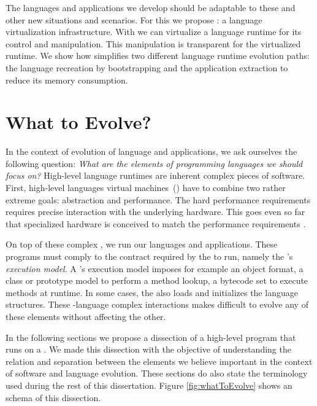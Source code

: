 The languages and applications we develop should be adaptable to these and other new situations and scenarios. For this we propose \emph{\Vtt}: a language virtualization infrastructure. With \Vtt we can virtualize a language runtime for its control and manipulation. This manipulation is transparent for the virtualized runtime. We show how \Vtt simplifies two different language runtime evolution paths: the language recreation by bootstrapping and the application extraction to reduce its memory consumption.

\section{What to Evolve?}

In the context of evolution of language and applications, we ask ourselves the following question: \emph{What are the elements of programming languages we should focus on?} High-level language runtimes are inherent complex pieces of software.
First, high-level languages virtual machines~(\VMs) have to combine two rather extreme goals: abstraction and performance.
The hard performance requirements requires precise interaction with the underlying hardware.
This goes even so far that specialized hardware is conceived to match the performance requirements \cite{Unga84a,Stef84a,McGh98a,Clic05a}.


On top of these complex \VMs, we run our  languages and applications.
These programs must comply to the contract required by the \VM to run, namely the \VM's \emph{execution model}.
A \VM's execution model imposes for example an object format, a class or prototype model to perform a method lookup, a bytecode set to execute methods at runtime.
In some cases, the \VM also loads and initializes the language structures.
These \VM-language complex interactions makes difficult to evolve any of these elements without affecting the other.

In the following sections we propose a dissection of a high-level program that runs on a \VM. We made this dissection with the objective of understanding the relation and separation between the elements we believe important in the context of software and language evolution. These sections do also state the terminology used during the rest of this dissertation. Figure \ref{fig:whatToEvolve} shows an schema of this dissection.

